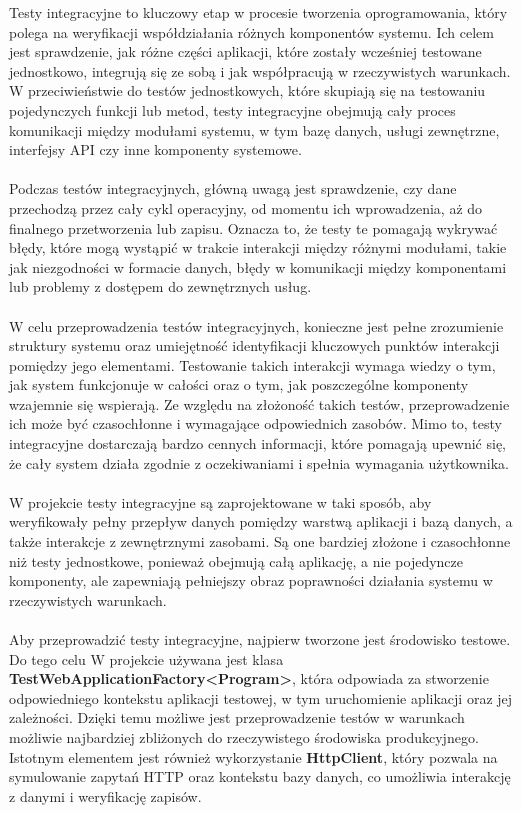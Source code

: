 \documentclass[12pt,a4paper]{article}
\begin{document}
\noindent
Testy integracyjne to kluczowy etap w procesie tworzenia oprogramowania, który polega na weryfikacji współdziałania różnych komponentów systemu. Ich celem jest sprawdzenie, jak różne części aplikacji, które zostały wcześniej testowane jednostkowo, integrują się ze sobą i jak współpracują w rzeczywistych warunkach. W przeciwieństwie do testów jednostkowych, które skupiają się na testowaniu pojedynczych funkcji lub metod, testy integracyjne obejmują cały proces komunikacji między modułami systemu, w tym bazę danych, usługi zewnętrzne, interfejsy API czy inne komponenty systemowe.
\\\\
Podczas testów integracyjnych, główną uwagą jest sprawdzenie, czy dane przechodzą przez cały cykl operacyjny, od momentu ich wprowadzenia, aż do finalnego przetworzenia lub zapisu. Oznacza to, że testy te pomagają wykrywać błędy, które mogą wystąpić w trakcie interakcji między różnymi modułami, takie jak niezgodności w formacie danych, błędy w komunikacji między komponentami lub problemy z dostępem do zewnętrznych usług.
\\\\
W celu przeprowadzenia testów integracyjnych, konieczne jest pełne zrozumienie struktury systemu oraz umiejętność identyfikacji kluczowych punktów interakcji pomiędzy jego elementami. Testowanie takich interakcji wymaga wiedzy o tym, jak system funkcjonuje w całości oraz o tym, jak poszczególne komponenty wzajemnie się wspierają. Ze względu na złożoność takich testów, przeprowadzenie ich może być czasochłonne i wymagające odpowiednich zasobów. Mimo to, testy integracyjne dostarczają bardzo cennych informacji, które pomagają upewnić się, że cały system działa zgodnie z oczekiwaniami i spełnia wymagania użytkownika.
\\\\
W projekcie testy integracyjne są zaprojektowane w taki sposób, aby weryfikowały pełny przepływ danych pomiędzy warstwą aplikacji i bazą danych, a także interakcje z zewnętrznymi zasobami. Są one bardziej złożone i czasochłonne niż testy jednostkowe, ponieważ obejmują całą aplikację, a nie pojedyncze komponenty, ale zapewniają pełniejszy obraz poprawności działania systemu w rzeczywistych warunkach.
\\\\
Aby przeprowadzić testy integracyjne, najpierw tworzone jest środowisko testowe. Do tego celu W projekcie używana jest klasa \textbf{TestWebApplicationFactory<Program>}, która odpowiada za stworzenie odpowiedniego kontekstu aplikacji testowej, w tym uruchomienie aplikacji oraz jej zależności. Dzięki temu możliwe jest przeprowadzenie testów w warunkach możliwie najbardziej zbliżonych do rzeczywistego środowiska produkcyjnego. Istotnym elementem jest również wykorzystanie \textbf{HttpClient}, który pozwala na symulowanie zapytań HTTP oraz kontekstu bazy danych, co umożliwia interakcję z danymi i weryfikację zapisów.
\end{document}

